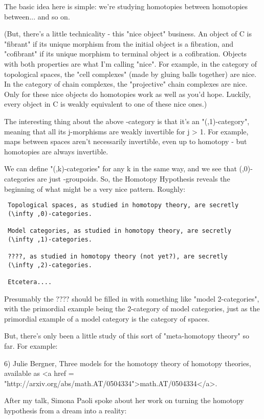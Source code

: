 The basic idea here is simple: we're studying homotopies between
homotopies between... and so on.

(But, there's a little technicality - this "nice object"
business.  An object of C is "fibrant" if its unique
morphism from the initial object is a fibration, and
"cofibrant" if its unique morphism to terminal object is a
cofibration.  Objects with both properties are what I'm calling
"nice".  For example, in the category of topological spaces,
the "cell complexes" (made by gluing balls together) are
nice.  In the category of chain complexes, the "projective"
chain complexes are nice.  Only for these nice objects do homotopies
work as well as you'd hope.  Luckily, every object in C is weakly
equivalent to one of these nice ones.)

The interesting thing about the above \infty -category is that it's
an "(\infty ,1)-category", meaning that all its j-morphisms
are weakly invertible for j > 1.  For example, maps between spaces
aren't necessarily invertible, even up to homotopy - but homotopies
are always invertible.

We can define "(\infty ,k)-categories" for any k in the same
way, and we see that (\infty ,0)-categories are just
\infty -groupoids.  So, the Homotopy Hypothesis reveals the beginning
of what might be a very nice pattern.  Roughly:

\begin{verbatim}
 Topological spaces, as studied in homotopy theory, are secretly 
 (\infty ,0)-categories.

 Model categories, as studied in homotopy theory, are secretly
 (\infty ,1)-categories.

 ????, as studied in homotopy theory (not yet?), are secretly
 (\infty ,2)-categories.

 Etcetera....
\end{verbatim}
    

Presumably the ???? should be filled in with something like 
"model 2-categories", with the primordial example being the 
2-category of model categories, just as the primordial example
of a model category is the category of spaces.  

But, there's only been a little study of this sort of
"meta-homotopy theory" so far.  For example:

6) Julie Bergner, Three models for the homotopy theory of homotopy
theories, available as <a href =
"http://arxiv.org/abs/math.AT/0504334">math.AT/0504334</a>.

After my talk, Simona Paoli spoke about her work on turning the
homotopy hypothesis from a dream into a reality:

